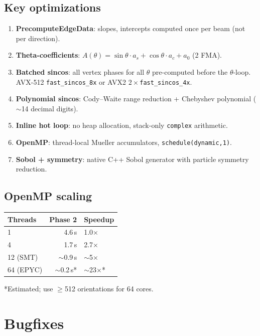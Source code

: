 \documentclass[11pt,a4paper]{article}
\begin{document}
\subsection{Key optimizations}
\begin{enumerate}
\item \textbf{PrecomputeEdgeData}: slopes, intercepts computed once per beam (not per direction).
\item \textbf{Theta-coefficients}: $A(\theta) = \sin\theta\cdot a_s + \cos\theta\cdot a_c + a_0$ (2 FMA).
\item \textbf{Batched sincos}: all vertex phases for all $\theta$ pre-computed before the $\theta$-loop. AVX-512 \texttt{fast\_sincos\_8x} or AVX2 $2\times$\texttt{fast\_sincos\_4x}.
\item \textbf{Polynomial sincos}: Cody--Waite range reduction + Chebyshev polynomial ($\sim$14 decimal digits).
\item \textbf{Inline hot loop}: no heap allocation, stack-only \texttt{complex} arithmetic.
\item \textbf{OpenMP}: thread-local Mueller accumulators, \texttt{schedule(dynamic,1)}.
\item \textbf{Sobol + symmetry}: native C++ Sobol generator with particle symmetry reduction.
\end{enumerate}

\subsection{OpenMP scaling}

\begin{tabular}{lrl}
\toprule
Threads & Phase 2 & Speedup \\
\midrule
1          & 4.6\,s & 1.0$\times$ \\
4          & 1.7\,s & 2.7$\times$ \\
12 (SMT)   & $\sim$0.9\,s & $\sim$5$\times$ \\
64 (EPYC)  & $\sim$0.2\,s* & $\sim$23$\times$* \\
\bottomrule
\end{tabular}

*Estimated; use $\geq$512 orientations for 64 cores.

\section{Bugfixes}
\end{document}
